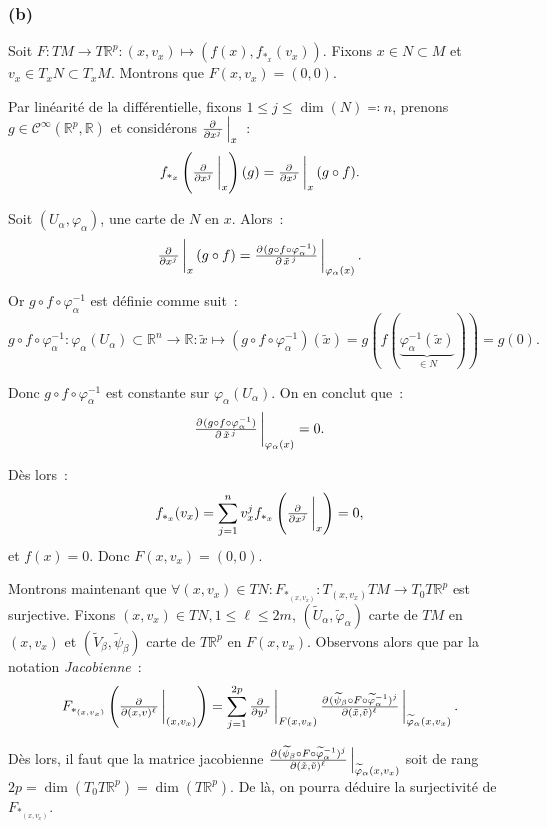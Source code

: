 \documentclass{article}
\newcommand{\R}{\mathbb R}
\begin{document}
\subsubsection*{(b)}
Soit $F : TM \to T\R^p : (x, v_x) \mapsto (f(x), f_{*_x}(v_x))$. Fixons $x \in N \subset M$ et $v_x \in T_xN \subset T_xM$. Montrons que $F(x, v_x) = (0, 0)$.

Par linéarité de la différentielle, fixons $1 \leq j \leq \dim(N) \eqqcolon n$, prenons $g \in \mathcal C^\infty(\R^p, \R)$ et considérons $\pd {}{{x^j}}\sVert[2]_x$~:
\[f_{*_x}\left(\pd {}{{x^j}}\sVert[3]_x\right)(g) = \pd {}{{x^j}}\sVert[3]_x(g \circ f).\]

Soit $(U_\alpha, \varphi_\alpha)$, une carte de $N$ en $x$. Alors~:
\[\pd {}{{x^j}}\sVert[3]_x(g \circ f) = \pd {(g \circ f \circ \varphi_\alpha^{-1})}{{\left.\tilde x\right.^j}}\sVert[3]_{\varphi_\alpha(x)}.\]

Or $g \circ f \circ \varphi_\alpha^{-1}$ est définie comme suit~:
\[g \circ f \circ \varphi_\alpha^{-1} : \varphi_\alpha(U_\alpha) \subset \R^n \to \R : \tilde x \mapsto (g \circ f \circ \varphi_\alpha^{-1})(\tilde x)
	= g(f(\underbrace {\varphi_\alpha^{-1}(\tilde x)}_{\in N})) = g(0).\]

Donc $g \circ f \circ \varphi_\alpha^{-1}$ est constante sur $\varphi_\alpha(U_\alpha)$. On en conclut que~:
\[\pd {(g \circ f \circ \varphi_\alpha^{-1})}{{\left.\tilde x\right.^j}}\sVert[3]_{\varphi_\alpha(x)} = 0.\]

Dès lors~:
\[f_{*_x}(v_x) = \sum_{j=1}^nv_x^jf_{*_x}\left(\pd {}{{x^j}}\sVert[3]_x\right) = 0,\]
et $f(x) = 0$. Donc $F(x, v_x) = (0, 0)$.

Montrons maintenant que $\forall (x, v_x) \in TN : F_{*_{(x, v_x)}} : T_{(x, v_x)}TM \to T_0T\R^p$ est surjective. Fixons $(x, v_x) \in TN, 1 \leq \ell \leq 2m$,
$(\widetilde U_\alpha, \widetilde \varphi_\alpha)$ carte de $TM$ en $(x, v_x)$ et $(\widetilde V_\beta, \widetilde \psi_\beta)$
carte de $T\R^p$ en $F(x, v_x)$. Observons alors que par la notation \textit{Jacobienne}~:
\[F_{*_{(x, v_x)}}\left(\pd {}{{(x, v)^\ell}}\sVert[3]_{(x, v_x)}\right)
	= \sum_{j=1}^{2p}\pd {}{{y^j}}\sVert[3]_{F(x, v_x)}
	                 \pd {(\widetilde \psi_\beta \circ F \circ \widetilde \varphi_\alpha^{-1})^j}
									     {{(\tilde x, \tilde v)^\ell}}\sVert[3]_{\widetilde \varphi_\alpha(x, v_x)}.\]

Dès lors, il faut que la matrice jacobienne
$\pd {(\widetilde \psi_\beta \circ F \circ \widetilde \varphi_\alpha^{-1})^j}{{(\tilde x, \tilde v)^\ell}}\sVert[2]_{\widetilde \varphi_\alpha(x, v_x)}$ soit
de rang $2p = \dim(T_0T\R^p) = \dim(T\R^p)$. De là, on pourra déduire la surjectivité de $F_{*_{(x, v_x)}}$.
\end{document}
